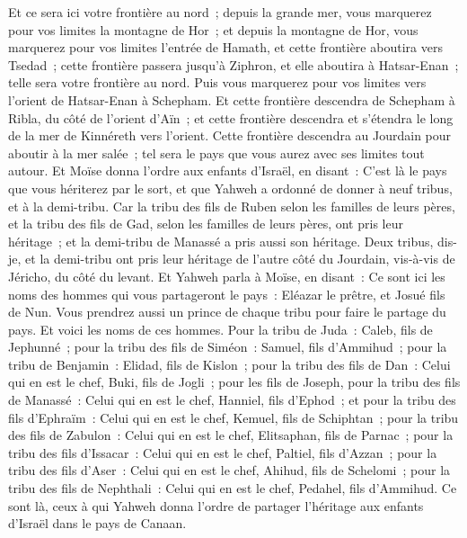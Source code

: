 \begin{multicols}{2}
Et ce sera ici votre frontière au nord~; depuis la grande mer, vous marquerez pour vos limites la montagne de Hor~;
et depuis la montagne de Hor, vous marquerez pour vos limites l'entrée de Hamath, et cette frontière aboutira vers Tsedad~;
cette frontière passera jusqu'à Ziphron, et elle aboutira à Hatsar-Enan~; telle sera votre frontière au nord.
Puis vous marquerez pour vos limites vers l'orient de Hatsar-Enan à Schepham.
Et cette frontière descendra de Schepham à Ribla, du côté de l'orient d'Aïn~; et cette frontière descendra et s'étendra le long de la mer de Kinnéreth vers l'orient.
Cette frontière descendra au Jourdain pour aboutir à la mer salée~; tel sera le pays que vous aurez avec ses limites tout autour.
Et Moïse donna l'ordre aux enfants d'Israël, en disant~: C'est là le pays que vous hériterez par le sort, et que Yahweh a ordonné de donner à neuf tribus, et à la demi-tribu.
Car la tribu des fils de Ruben selon les familles de leurs pères, et la tribu des fils de Gad, selon les familles de leurs pères, ont pris leur héritage~; et la demi-tribu de Manassé a pris aussi son héritage.
Deux tribus, dis-je, et la demi-tribu ont pris leur héritage de l'autre côté du Jourdain, vis-à-vis de Jéricho, du côté du levant.
Et Yahweh parla à Moïse, en disant~:
Ce sont ici les noms des hommes qui vous partageront le pays~: Eléazar le prêtre, et Josué fils de Nun.
Vous prendrez aussi un prince de chaque tribu pour faire le partage du pays.
Et voici les noms de ces hommes. Pour la tribu de Juda~: Caleb, fils de Jephunné~;
pour la tribu des fils de Siméon~: Samuel, fils d'Ammihud~;
pour la tribu de Benjamin~: Elidad, fils de Kislon~;
pour la tribu des fils de Dan~: Celui qui en est le chef, Buki, fils de Jogli~;
pour les fils de Joseph, pour la tribu des fils de Manassé~: Celui qui en est le chef, Hanniel, fils d'Ephod~;
et pour la tribu des fils d'Ephraïm~: Celui qui en est le chef, Kemuel, fils de Schiphtan~;
pour la tribu des fils de Zabulon~: Celui qui en est le chef, Elitsaphan, fils de Parnac~;
pour la tribu des fils d'Issacar~: Celui qui en est le chef, Paltiel, fils d'Azzan~;
pour la tribu des fils d'Aser~: Celui qui en est le chef, Ahihud, fils de Schelomi~;
pour la tribu des fils de Nephthali~: Celui qui en est le chef, Pedahel, fils d'Ammihud.
Ce sont là, ceux à qui Yahweh donna l'ordre de partager l'héritage aux enfants d'Israël dans le pays de Canaan.

\end{multicols}
